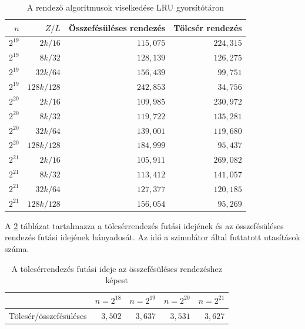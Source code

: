 \documentclass[12pt]{report}
\begin{document}
\begin{table}[ht]
\centering
\caption{A rendező algoritmusok viselkedése LRU gyorsítótáron}
\label{table-sorting}
\begin{tabular}{|r|r|r|r|}
\hline
$n$ & $Z/L$ & Összefésüléses rendezés & Tölcsér rendezés \\
\hline
$2^{19}$ &    $2k/16$ & $115,075$ & $224,315$ \\
\hline
$2^{19}$ &    $8k/32$ & $128,139$ & $126,275$ \\
\hline
$2^{19}$ &   $32k/64$ & $156,439$ &  $99,751$ \\
\hline
$2^{19}$ & $128k/128$ & $242,853$ &  $34,756$ \\
\hline
$2^{20}$ &    $2k/16$ & $109,985$ & $230,972$ \\
\hline
$2^{20}$ &    $8k/32$ & $119,722$ & $135,281$ \\
\hline
$2^{20}$ &   $32k/64$ & $139,001$ & $119,680$ \\
\hline
$2^{20}$ & $128k/128$ & $184,999$ &  $95,437$ \\
\hline
$2^{21}$ &    $2k/16$ & $105,911$ & $269,082$ \\
\hline
$2^{21}$ &    $8k/32$ & $113,412$ & $141,057$ \\
\hline
$2^{21}$ &   $32k/64$ & $127,377$ & $120,185$ \\
\hline
$2^{21}$ & $128k/128$ & $156,054$ & $95,269$ \\
\hline
\end{tabular}
\end{table}

A \ref{table-sorting-elapsed-cycles} táblázat tartalmazza
a tölcsérrendezés futási idejének és az összefésüléses
rendezés futási idejének hányadosát.
Az idő a szimulátor által futtatott utasítások száma.

\begin{table}[ht]
\centering
\caption{A tölcsérrendezés futási ideje az összefésüléses rendezéshez képest}
\label{table-sorting-elapsed-cycles}
\begin{tabular}{|r|r|r|r|r|}
\hline
 & $n=2^{18}$ & $n=2^{19}$ & $n=2^{20}$ & $n=2^{21}$ \\
\hline
Tölcsér/összefésüléses & $3,502$ & $3,637$ & $3,531$ & $3,627$ \\
\hline
\end{tabular}
\end{table}
\end{document}
